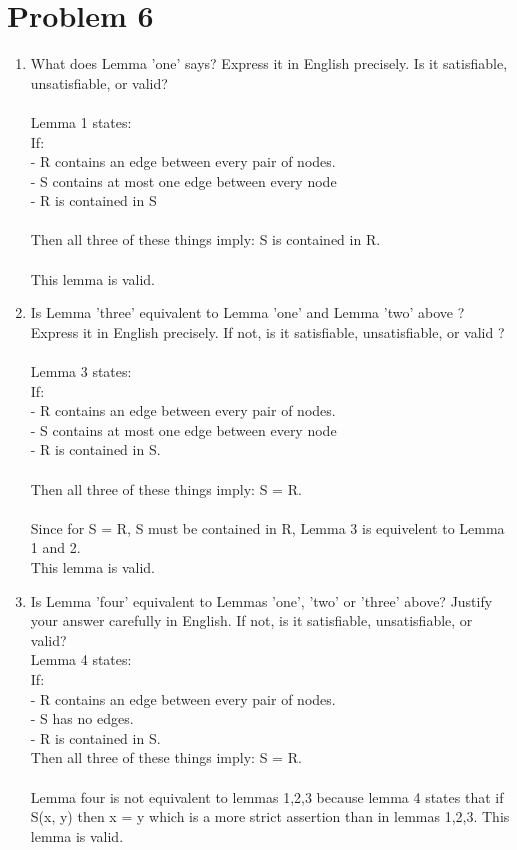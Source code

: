 \documentclass[11pt,leqno,fleqn]{article}
\begin{document}
\newpage
\section{Problem 6}
\begin{enumerate}[(1)]
\item %
What does Lemma 'one' says? Express it in English precisely. Is it satisfiable, unsatisfiable, or valid?\\
\\
Lemma 1 states:\\
 If:\\
- R contains an edge between every pair of nodes.\\
-  S contains at most one edge between every node\\
- R is contained in S\\
\\
Then all three of these things imply: S is contained in R.\\
\\
This lemma is valid.
\item %
Is Lemma 'three' equivalent to Lemma 'one' and Lemma 'two' above ? Express it in English precisely. If not, is it satisfiable, unsatisfiable,  or valid ?\\
\\
Lemma 3 states:\\
If:\\
- R contains an edge between every pair of nodes. \\
-  S contains at most one edge between every node \\
- R is contained in S. \\
\\
Then all three of these things imply: S = R.\\
\\
Since for S = R, S must be contained in R, Lemma 3 is equivelent to Lemma 1 and 2.\\
This lemma is valid.\\

\newpage
\item %
Is Lemma 'four' equivalent to Lemmas 'one', 'two' or 'three' above? Justify your answer carefully in English. If not, is it satisfiable, unsatisfiable, or valid?\\
Lemma 4 states:\\
If:\\
- R contains an edge between every pair of nodes. \\
- S has no edges. \\
- R is contained in S. \\ 
Then all three of these things imply: S = R.\\
\\
Lemma four is not equivalent to lemmas 1,2,3 because lemma 4 states that if S(x, y) then x = y which is a more strict assertion than in lemmas 1,2,3.
This lemma is valid.\\


\end{enumerate}
\end{document}
